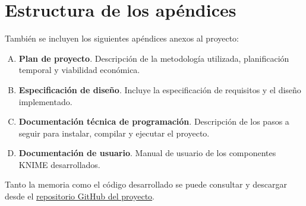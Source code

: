 \section{Estructura de los apéndices}

También se incluyen los siguientes apéndices anexos al proyecto: 
\

\begin{enumerate}[A.]
	\item \textbf{Plan de proyecto}. Descripción de la metodología utilizada, planificación temporal y viabilidad económica. 
	\item \textbf{Especificación de diseño}. Incluye la especificación de requisitos y el diseño implementado.
	\item \textbf{Documentación técnica de programación}. Descripción de los pasos a seguir para instalar, compilar y ejecutar el proyecto.
	\item \textbf{Documentación de usuario}. Manual de usuario de los componentes KNIME desarrollados. 
\end{enumerate}

Tanto la memoria como el código desarrollado se puede consultar y descargar desde el \href{https://github.com/frankgil/knime-moodle}{repositorio GitHub del proyecto}.